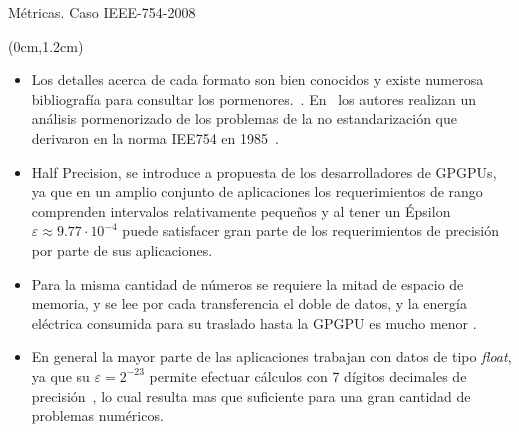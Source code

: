 \documentclass[usenames,table,dvipsnames,aspectratio=169]{beamer}
\begin{document}
\begin{frame}{Métricas. Caso IEEE-754-2008}
 \begin{textblock*}{\textwidth}(0cm,1.2cm)
  \begin{itemize} [<+->]\justifying \parskip .15cm
   \item Los detalles acerca de cada formato son bien conocidos y existe numerosa bibliografía para consultar los pormenores.~\cite{Overton2001}. En~\cite{Sun2001} los autores realizan un análisis pormenorizado de los problemas de la no estandarización que derivaron en la norma IEE754 en 1985~\cite{Cowlishaw2003,Monieaux2008}.
   \item Half Precision, se introduce a propuesta de los desarrolladores de GPGPUs, ya que en un amplio conjunto de aplicaciones los requerimientos de rango comprenden intervalos relativamente pequeños y al tener un Épsilon $\varepsilon \approx 9.77 \cdot 10^{-4}$ puede satisfacer gran parte de los requerimientos de precisión por parte de sus aplicaciones.
   \item Para la misma cantidad de números se requiere la mitad de espacio de memoria, y se lee por cada transferencia el doble de datos, y la energía eléctrica consumida para su traslado hasta la GPGPU es mucho menor .
   \item En general la mayor parte de las aplicaciones trabajan con datos de tipo \textit{float}, ya que su $\varepsilon=2^{-23}$ permite efectuar cálculos con 7 dígitos decimales de precisión~\cite{Overton2001}, lo cual resulta mas que suficiente para una gran cantidad de problemas numéricos.
  \end{itemize}
 \end{textblock*}
\end{frame}
\end{document}
